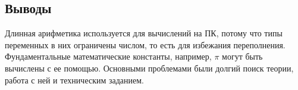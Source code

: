 \documentclass[12pt]{article}
\begin{document}
\subsection*{Выводы}

Длинная арифметика используется для вычислений на ПК, потому что типы переменных в них ограничены числом, то есть для избежания переполнения. Фундаментальные математические константы, например, $\pi$ могут быть вычислены с ее помощью. Основными проблемами были долгий поиск теории, работа с ней и техническим заданием. 
\end{document}
